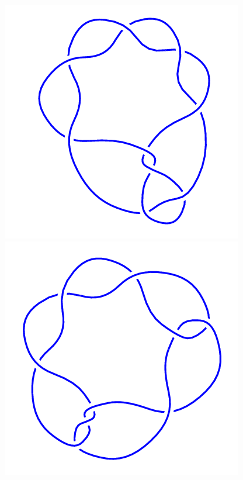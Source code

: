 \begin{figure}[H]
    \begin{minipage}[b]{.18\linewidth}
        \centering
        \includegraphics[width=\linewidth]{../data/9_6.png}
    \end{minipage}
    \begin{minipage}[b]{.18\linewidth}
        \centering
        \includegraphics[width=\linewidth]{../data/9_7.png}

\end{minipage}
\end{figure}
